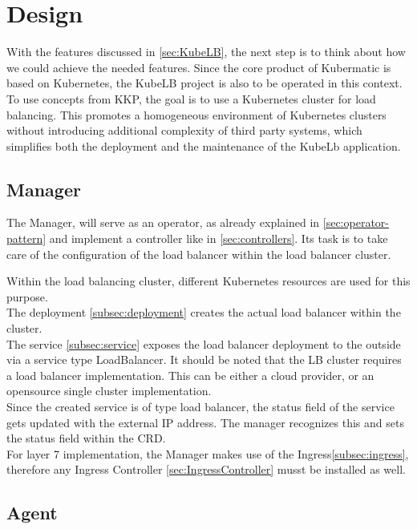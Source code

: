 \chapter{Design}

With the features discussed in \autoref{sec:KubeLB}, the next step is to think about how we could achieve the needed features.
Since the core product of Kubermatic is based on Kubernetes, the KubeLB project is also to be operated in this context.
To use concepts from KKP, the goal is to use a Kubernetes cluster for load balancing.
This promotes a homogeneous environment of Kubernetes clusters without introducing additional complexity of third party systems, which simplifies both the deployment and the maintenance of the KubeLb application.

\section{Manager}

The Manager, will serve as an operator, as already explained in \autoref{sec:operator-pattern} and implement a controller like in \autoref{sec:controllers}.
Its task is to take care of the configuration of the load balancer within the load balancer cluster.

Within the load balancing cluster, different Kubernetes resources are used for this purpose.
\\
The deployment \autoref{subsec:deployment} creates the actual load balancer within the cluster.
\\
The service \autoref{subsec:service} exposes the load balancer deployment to the outside via a service type LoadBalancer.
It should be noted that the LB cluster requires a load balancer implementation.
This can be either a cloud provider, or an opensource single cluster implementation.
\\
Since the created service is of type load balancer, the status field of the service gets updated with the external IP address.
The manager recognizes this and sets the status field within the CRD.
\\
For layer 7 implementation, the Manager makes use of the Ingress\autoref{subsec:ingress}, therefore any Ingress Controller \autoref{sec:IngressController} musst be installed as well.

\section{Agent}

